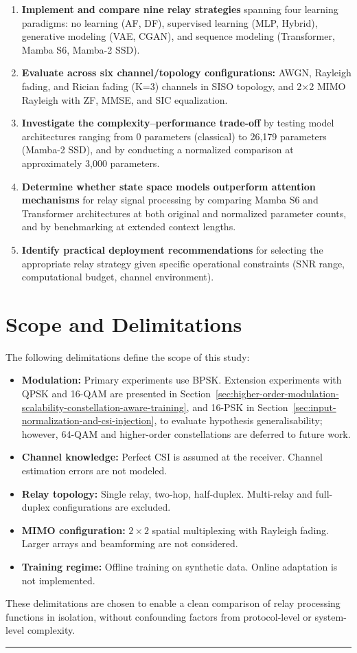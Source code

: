 \begin{enumerate}
\def\labelenumi{\arabic{enumi}.}
\item
  \textbf{Implement and compare nine relay strategies} spanning four learning paradigms: no learning (AF, DF), supervised learning (MLP, Hybrid), generative modeling (VAE, CGAN), and sequence modeling (Transformer, Mamba S6, Mamba-2 SSD).
\item
  \textbf{Evaluate across six channel/topology configurations:} AWGN, Rayleigh fading, and Rician fading (K=3) channels in SISO topology, and 2×2 MIMO Rayleigh with ZF, MMSE, and SIC equalization.
\item
  \textbf{Investigate the complexity--performance trade-off} by testing model architectures ranging from 0 parameters (classical) to 26,179 parameters (Mamba-2 SSD), and by conducting a normalized comparison at approximately 3,000 parameters.
\item
  \textbf{Determine whether state space models outperform attention mechanisms} for relay signal processing by comparing Mamba S6 and Transformer architectures at both original and normalized parameter counts, and by benchmarking at extended context lengths.
\item
  \textbf{Identify practical deployment recommendations} for selecting the appropriate relay strategy given specific operational constraints (SNR range, computational budget, channel environment).
\end{enumerate}

\section{Scope and Delimitations}\label{sec:scope-and-delimitations}

The following delimitations define the scope of this study:

\begin{itemize}
\tightlist
\item
  \textbf{Modulation:} Primary experiments use BPSK. Extension experiments with QPSK and 16-QAM are presented in Section~\ref{sec:higher-order-modulation-scalability-constellation-aware-training}, and 16-PSK in Section~\ref{sec:input-normalization-and-csi-injection}, to evaluate hypothesis generalisability; however, 64-QAM and higher-order constellations are deferred to future work.
\item
  \textbf{Channel knowledge:} Perfect CSI is assumed at the receiver. Channel estimation errors are not modeled.
\item
  \textbf{Relay topology:} Single relay, two-hop, half-duplex. Multi-relay and full-duplex configurations are excluded.
\item
  \textbf{MIMO configuration:} \(2 \times 2\) spatial multiplexing with Rayleigh fading. Larger arrays and beamforming are not considered.
\item
  \textbf{Training regime:} Offline training on synthetic data. Online adaptation is not implemented.
\end{itemize}

These delimitations are chosen to enable a clean comparison of relay processing functions in isolation, without confounding factors from protocol-level or system-level complexity.

\begin{center}\rule{0.5\linewidth}{0.5pt}\end{center}

